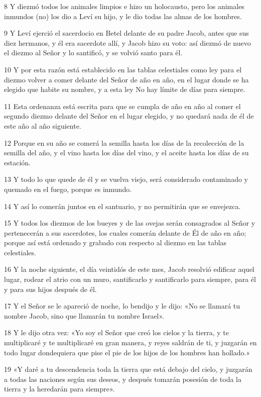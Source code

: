 \par 8 Y diezmó todos los animales limpios e hizo un holocausto, pero los animales inmundos (no) los dio a Leví su hijo, y le dio todas las almas de los hombres.
\par 9 Y Leví ejerció el sacerdocio en Betel delante de su padre Jacob, antes que sus diez hermanos, y él era sacerdote allí, y Jacob hizo su voto: así diezmó de nuevo el diezmo al Señor y lo santificó, y se volvió santo para él.
\par 10 Y por esta razón está establecido en las tablas celestiales como ley para el diezmo volver a comer delante del Señor de año en año, en el lugar donde se ha elegido que habite su nombre, y a esta ley No hay límite de días para siempre.
\par 11 Esta ordenanza está escrita para que se cumpla de año en año al comer el segundo diezmo delante del Señor en el lugar elegido, y no quedará nada de él de este año al año siguiente.
\par 12 Porque en su año se comerá la semilla hasta los días de la recolección de la semilla del año, y el vino hasta los días del vino, y el aceite hasta los días de su estación.
\par 13 Y todo lo que quede de él y se vuelva viejo, será considerado contaminado y quemado en el fuego, porque es inmundo.
\par 14 Y así lo comerán juntos en el santuario, y no permitirán que se envejezca.
\par 15 Y todos los diezmos de los bueyes y de las ovejas serán consagrados al Señor y pertenecerán a sus sacerdotes, los cuales comerán delante de Él de año en año; porque así está ordenado y grabado con respecto al diezmo en las tablas celestiales.
\par 16 Y la noche siguiente, el día veintidós de este mes, Jacob resolvió edificar aquel lugar, rodear el atrio con un muro, santificarlo y santificarlo para siempre, para él y para sus hijos después de él.
\par 17 Y el Señor se le apareció de noche, lo bendijo y le dijo: «No se llamará tu nombre Jacob, sino que llamarán tu nombre Israel».
\par 18 Y le dijo otra vez: «Yo soy el Señor que creó los cielos y la tierra, y te multiplicaré y te multiplicaré en gran manera, y reyes saldrán de ti, y juzgarán en todo lugar dondequiera que pise el pie de los hijos de los hombres han hollado.»
\par 19 «Y daré a tu descendencia toda la tierra que está debajo del cielo, y juzgarán a todas las naciones según sus deseos, y después tomarán posesión de toda la tierra y la heredarán para siempre».

